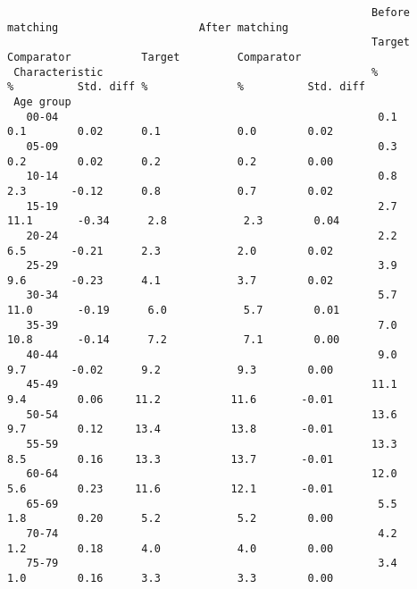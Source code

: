 \documentclass[]{article}
\begin{document}
\begin{verbatim}
                                                         Before matching                      After matching                     
                                                         Target          Comparator           Target         Comparator          
 Characteristic                                          %               %          Std. diff %              %          Std. diff
 Age group                                                                                                                       
   00-04                                                  0.1             0.1        0.02      0.1            0.0        0.02    
   05-09                                                  0.3             0.2        0.02      0.2            0.2        0.00    
   10-14                                                  0.8             2.3       -0.12      0.8            0.7        0.02    
   15-19                                                  2.7            11.1       -0.34      2.8            2.3        0.04    
   20-24                                                  2.2             6.5       -0.21      2.3            2.0        0.02    
   25-29                                                  3.9             9.6       -0.23      4.1            3.7        0.02    
   30-34                                                  5.7            11.0       -0.19      6.0            5.7        0.01    
   35-39                                                  7.0            10.8       -0.14      7.2            7.1        0.00    
   40-44                                                  9.0             9.7       -0.02      9.2            9.3        0.00    
   45-49                                                 11.1             9.4        0.06     11.2           11.6       -0.01    
   50-54                                                 13.6             9.7        0.12     13.4           13.8       -0.01    
   55-59                                                 13.3             8.5        0.16     13.3           13.7       -0.01    
   60-64                                                 12.0             5.6        0.23     11.6           12.1       -0.01    
   65-69                                                  5.5             1.8        0.20      5.2            5.2        0.00    
   70-74                                                  4.2             1.2        0.18      4.0            4.0        0.00    
   75-79                                                  3.4             1.0        0.16      3.3            3.3        0.00    

\end{verbatim}
\end{document}
